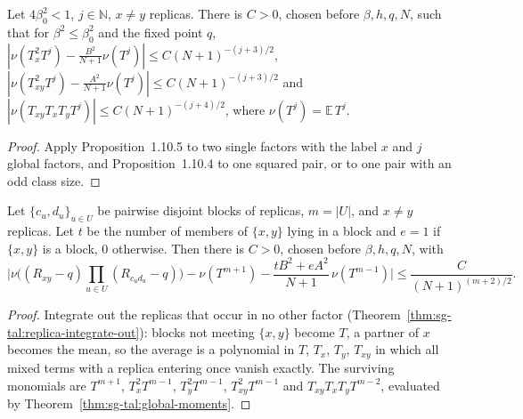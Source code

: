 \begin{theorem}
\label{thm:sg-tal:global-moments}
\leanok
{}
Let $4\beta_0^2<1$, $j\in\mathbb N$, $x\ne y$ replicas. There is $C>0$, chosen before
$\beta,h,q,N$, such that for $\beta^2\le\beta_0^2$ and the fixed point $q$,
$|\nu(T_x^2T^j)-\tfrac{B^2}{N+1}\nu(T^j)|\le C(N+1)^{-(j+3)/2}$,
$|\nu(T_{xy}^2T^j)-\tfrac{A^2}{N+1}\nu(T^j)|\le C(N+1)^{-(j+3)/2}$ and
$|\nu(T_{xy}T_xT_yT^j)|\le C(N+1)^{-(j+4)/2}$, where $\nu(T^j)=\mathbb E\,T^j$.
\end{theorem}
\begin{proof}
\leanok
Apply Proposition~1.10.5 to two single factors with the label $x$ and $j$ global factors, and
Proposition~1.10.4 to one squared pair, or to one pair with an odd class size.
\end{proof}

\begin{theorem}
\label{thm:sg-tal:blocks-classification}
\leanok
{}
Let $\{c_u,d_u\}_{u\in U}$ be pairwise disjoint blocks of replicas, $m=|U|$, and $x\ne y$ replicas.
Let $t$ be the number of members of $\{x,y\}$ lying in a block and $e=1$ if $\{x,y\}$ is a block, $0$
otherwise. Then there is $C>0$, chosen before $\beta,h,q,N$, with
\[
 \Big|\nu\Big((R_{xy}-q)\prod_{u\in U}(R_{c_ud_u}-q)\Big)-\nu(T^{m+1})-\frac{tB^2+eA^2}{N+1}\,\nu(T^{m-1})\Big|\le\frac{C}{(N+1)^{(m+2)/2}}.
\]
\end{theorem}
\begin{proof}
\leanok
Integrate out the replicas that occur in no other factor (Theorem~\ref{thm:sg-tal:replica-integrate-out}):
blocks not meeting $\{x,y\}$ become $T$, a partner of $x$ becomes the mean, so the average is a polynomial in $T$,
$T_x$, $T_y$, $T_{xy}$ in which all mixed terms with a replica entering once vanish exactly.
The surviving monomials are $T^{m+1}$, $T_x^2T^{m-1}$, $T_y^2T^{m-1}$, $T_{xy}^2T^{m-1}$ and
$T_{xy}T_xT_yT^{m-2}$, evaluated by Theorem~\ref{thm:sg-tal:global-moments}.
\end{proof}

